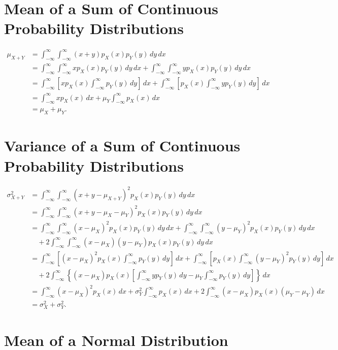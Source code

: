 \documentclass{myart}
\newcommand{\intr}{\int_{-\infty}^\infty}
\newcommand{\dx}{\,dx}
\newcommand{\dy}{\,dy}
\newcommand{\mean}{\mu}
\newcommand{\variance}{\sigma^2}
\begin{document}
\section{Mean of a Sum of Continuous Probability Distributions}

\begin{align*}
\mean_{X+Y} &= \intr \intr (x + y) p_X(x) p_Y(y) \dy \dx \\
&= \intr \intr x p_X(x) p_Y(y) \dy \dx + \intr \intr y p_X(x) p_Y(y) \dy \dx \\
&= \intr \left[x p_X(x) \intr p_Y(y) \dy\right] \dx + \intr \left[p_X(x) \intr y p_Y(y) \dy\right] \dx \\
&= \intr x p_X(x) \dx + \mean_Y \intr p_X(x) \dx \\
&= \mean_X + \mean_Y.
\end{align*}

\section{Variance of a Sum of Continuous Probability Distributions}

\begin{align*}
\variance_{X+Y} &= \intr \intr (x + y - \mean_{X+Y})^2 p_X(x) p_Y(y) \dy \dx \\
&= \intr \intr (x + y - \mean_X - \mean_Y)^2 p_X(x) p_Y(y) \dy \dx \\
&= \intr \intr (x - \mean_X)^2 p_X(x) p_Y(y) \dy \dx + \intr \intr (y - \mean_Y)^2 p_X(x) p_Y(y) \dy \dx \\
&\quad + 2 \intr \intr (x - \mean_X)(y - \mean_Y) p_X(x) p_Y(y) \dy \dx \\
&= \intr \left[(x - \mean_X)^2 p_X(x) \intr p_Y(y) \dy\right] \dx + \intr \left[p_X(x) \intr (y - \mean_Y)^2 p_Y(y) \dy\right] \dx \\
&\quad + 2 \intr \left\{(x - \mean_X) p_X(x) \left[\intr y p_Y(y) \dy - \mean_Y \intr p_Y(y) \dy\right]\right\} \dx \\
&= \intr (x - \mean_X)^2 p_X(x) \dx + \variance_Y \intr p_X(x) \dx + 2 \intr (x - \mean_X) p_X(x) (\mean_Y - \mean_Y) \dx \\
&= \variance_X + \variance_Y.
\end{align*}

\section{Mean of a Normal Distribution}
\end{document}
